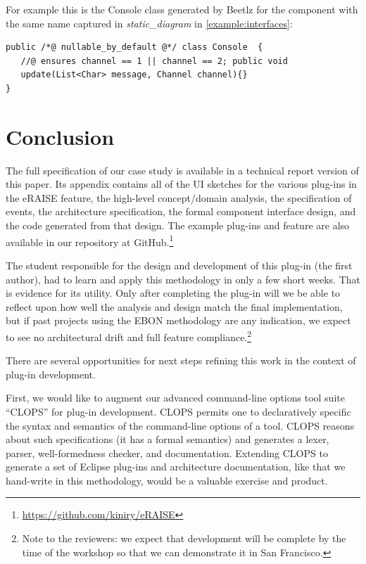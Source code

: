 \documentclass[conference]{IEEEtran}
\begin{document}
For example this is the Console class generated by Beetlz for the
component with the same name captured in \emph{static\_diagram} in
\autoref{example:interfaces}:

\begin{lstlisting}
public /*@ nullable_by_default @*/ class Console  {
   //@ ensures channel == 1 || channel == 2; public void
   update(List<Char> message, Channel channel){}
}
\end{lstlisting}

\section{Conclusion}
\label{sec:conclusion}

The full specification of our case study is available in a technical
report version of this paper.  Its appendix contains all of the UI
sketches for the various plug-ins in the eRAISE feature, the high-level
concept/domain analysis, the specification of events, the architecture
specification, the formal component interface design, and the code
generated from that design.  The example plug-ins and feature are also
available in our repository at
GitHub.\footnote{\url{https://github.com/kiniry/eRAISE}}

The student responsible for the design and development of this plug-in
(the first author), had to learn and apply this methodology in only a
few short weeks.  That is evidence for its utility.  Only after
completing the plug-in will we be able to reflect upon how well the
analysis and design match the final implementation, but if past
projects using the EBON methodology are any indication, we expect to
see no architectural drift and full feature compliance.\footnote{Note
  to the reviewers: we expect that development will be complete by the
  time of the workshop so that we can demonstrate it in San Francisco.}

There are several opportunities for next steps refining this work in
the context of plug-in development.  

First, we would like to augment our advanced command-line options tool
suite ``CLOPS'' for plug-in development.  CLOPS permits one to
declaratively specific the syntax and semantics of the command-line
options of a tool.  CLOPS reasons about such specifications (it has a
formal semantics) and generates a lexer, parser, well-formedness
checker, and documentation.  Extending CLOPS to generate a set of
Eclipse plug-ins and architecture documentation, like that we
hand-write in this methodology, would be a valuable exercise and
product.
\end{document}
